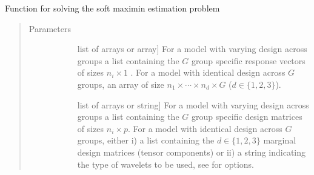 \documentclass[letterpaper,10pt,english]{sphinxmanual}
\begin{document}

\begin{fulllineitems}
\label{\detokenize{pysmme:pysmme.tools.softmaximin}}
\sphinxAtStartPar
Function for solving the soft maximin estimation problem
\begin{quote}\begin{description}
\item[{Parameters}] \leavevmode\begin{description}
\item[{}] \leavevmode{[}list of arrays or array{]}
\sphinxAtStartPar
For a model with varying design across groups a list containing the \(G\) group specific 
response vectors of sizes \(n_i \times 1\) . For a model with identical design 
across \(G\) groups, 
an array of size \(n_1 \times\cdots\times n_d \times G\) (\(d \in \{ 1, 2, 3\}\)).

\item[{}] \leavevmode{[}list of arrays or string{]}
\sphinxAtStartPar
For a model with varying design across groups a list containing the 
\(G\) group specific design matrices of sizes \(n_i \times p\).  
For a model with identical design across \(G\) groups, either i) a list containing the 
\(d \in \{ 1, 2, 3\}\) marginal design matrices (tensor components) or ii) 
a string indicating the type of wavelets to be used, see  for options.


\end{description}
\end{description}
\end{quote}
\end{fulllineitems}
\end{document}
